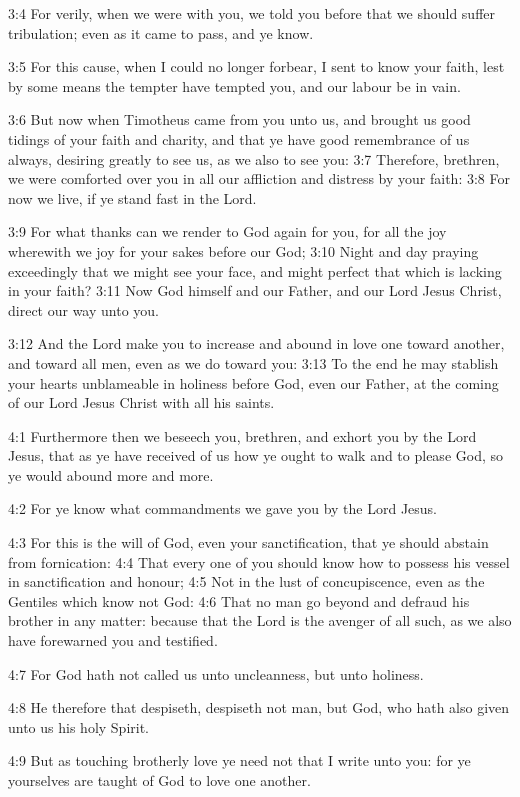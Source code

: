 3:4 For verily, when we were with you, we told you before that we should suffer tribulation; even as it came to pass, and ye know.

3:5 For this cause, when I could no longer forbear, I sent to know your faith, lest by some means the tempter have tempted you, and our labour be in vain.

3:6 But now when Timotheus came from you unto us, and brought us good tidings of your faith and charity, and that ye have good remembrance of us always, desiring greatly to see us, as we also to see you: 3:7 Therefore, brethren, we were comforted over you in all our affliction and distress by your faith: 3:8 For now we live, if ye stand fast in the Lord.

3:9 For what thanks can we render to God again for you, for all the joy wherewith we joy for your sakes before our God; 3:10 Night and day praying exceedingly that we might see your face, and might perfect that which is lacking in your faith?  3:11 Now God himself and our Father, and our Lord Jesus Christ, direct our way unto you.

3:12 And the Lord make you to increase and abound in love one toward another, and toward all men, even as we do toward you: 3:13 To the end he may stablish your hearts unblameable in holiness before God, even our Father, at the coming of our Lord Jesus Christ with all his saints.

4:1 Furthermore then we beseech you, brethren, and exhort you by the Lord Jesus, that as ye have received of us how ye ought to walk and to please God, so ye would abound more and more.

4:2 For ye know what commandments we gave you by the Lord Jesus.

4:3 For this is the will of God, even your sanctification, that ye should abstain from fornication: 4:4 That every one of you should know how to possess his vessel in sanctification and honour; 4:5 Not in the lust of concupiscence, even as the Gentiles which know not God: 4:6 That no man go beyond and defraud his brother in any matter: because that the Lord is the avenger of all such, as we also have forewarned you and testified.

4:7 For God hath not called us unto uncleanness, but unto holiness.

4:8 He therefore that despiseth, despiseth not man, but God, who hath also given unto us his holy Spirit.

4:9 But as touching brotherly love ye need not that I write unto you: for ye yourselves are taught of God to love one another.

